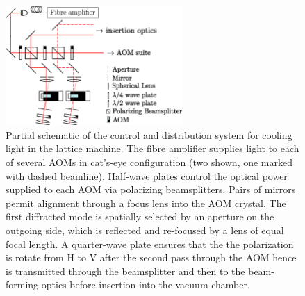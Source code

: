 	


	\begin{figure}
		\centering
		\includegraphics[width=0.6\textwidth]{fig/apparatus/distribution_optics}
		\caption{Partial schematic of the control and distribution system for cooling light in the lattice machine. The fibre amplifier supplies light to each of several AOMs in cat's-eye configuration (two shown, one marked with dashed beamline). Half-wave plates control the optical power supplied to each AOM via polarizing beamsplitters. Pairs of mirrors permit alignment through a focus lens into the AOM crystal. The first diffracted mode is spatially selected by an aperture on the outgoing side, which is reflected and re-focused by a lens of equal focal length. A quarter-wave plate ensures that the the polarization is rotate from H to V after the second pass through the AOM hence is transmitted through the beamsplitter and then to the beam-forming optics before insertion into the vacuum chamber. }
		\label{fig:distribution_optics}
	\end{figure}

